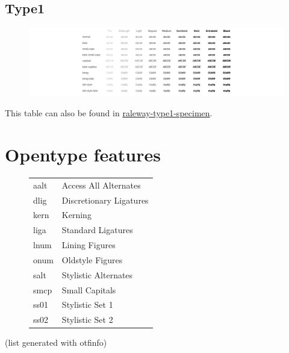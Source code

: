 \documentclass[10pt,a4paper,english]{article}
\newcommand*\file[1]{\href{run:#1.pdf}{#1}}
\begin{document}
\subsection{Type1}
\begin{figure}[ht]
	\centering
	\includegraphics[width=\textwidth]{raleway-type1-specimen}
\end{figure}
This table can also be found in \file{raleway-type1-specimen}.

\newpage
\section{Opentype features}
\label{sec:otfinfo}

\begin{figure}[ht]
	\centering
	\begin{tabular}{>{\ttfamily}l l}
		aalt & Access All Alternates \\
		dlig & Discretionary Ligatures \\
		kern & Kerning \\
		liga & Standard Ligatures \\
		lnum & Lining Figures \\
		onum & Oldstyle Figures \\
		salt & Stylistic Alternates \\
		smcp & Small Capitals \\
		ss01 & Stylistic Set 1 \\
		ss02 & Stylistic Set 2 \\
	\end{tabular}
\end{figure}
(list generated with otfinfo)
\end{document}
